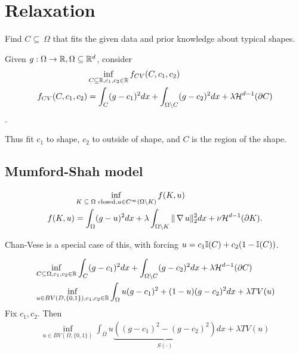 \chapter{Relaxation}
\label{cha:relaxation}

\newcommand{\gcc}{\textsc{gcc}\xspace}

\begin{exmp}[Segmentation]
  \label{defn:relaxation:1}
  Find $C \subseteq\ \Omega$ that fits the given data and prior
  knowledge about typical shapes.
\end{exmp}

\begin{thm}
  \label{defn:relaxation:2}
  Given $g: \Omega \rightarrow \mathbb{R}, \Omega \subseteq \mathbb{R}^{d}$, consider
  \begin{align}
    \label{eq:110}
    &\inf_{C \subseteq \mathbb{R}, c_{1}, c_{2} \in \mathbb{R}} f_{CV}(C, c_{1}, c_{2})
  \\
  f_{CV}(C, c_{1}, c_{2}) &= \int_{C}(g - c_{1})^{2} dx + \int_{\Omega
    \backslash C} (g -
  c_{2})^{2} dx + \lambda \mathcal{H}^{d-1}(\partial C)
  \end{align}
  .

  Thus fit $c_{1}$ to shape, $c_{2}$ to outside of shape, and $C$ is
  the region of the shape.
\end{thm}

\section{Mumford-Shah model}
\label{sec:mumford-shah-model}

\begin{align}
  \label{eq:111}
  &\inf_{\text{$K \subseteq \Omega$ closed}, u \in C^{\infty}(\Omega
    \backslash K)} f(K, u) \\
  f(K, u) &= \int_{\Omega} (g - u)^{2} dx + \lambda \int_{\Omega
    \backslash K} \| \operatorname*{\nabla} u \|_{2}^{2} dx + \nu
  \mathcal{H}^{d-1}(\partial K).
\end{align} 

Chan-Vese is a special case of this, with forcing $u = c_{1} \I{C} +
c_{2}(1 - \I{C})$.


\begin{align}
  \label{eq:112}
  &\inf_{C \subseteq \Omega, c_{1}, c_{2} \in \mathbb{R}} \int_{C} (g -
  c_{1})^{2} dx + \int_{\Omega \backslash C} (g - c_{2})^{2} dx +
  \lambda \mathcal{H}^{d-1}(\partial C) \\
  &\inf_{u \in BV(D, \{ 0, 1 \}), c_{1}, c_{2} \in \mathbb{R}} \int_{\Omega} u
  (g - c_{1})^{2} + (1-u) (g - c_{2})^{2} dx + \lambda TV(u)
\end{align}  Fix $c_{1}, c_{2}$.  Then
\begin{align}
  \label{eq:113}
  \tag{$C$}
  \inf_{u \in BV(\Omega, \{ 0, 1 \})} \int_{\Omega} u \underbrace{((g - c_{1})^{2}
  - (g - c_{2})^{2})}_{S(\cdot)} dx + \lambda TV(u)
\end{align}

